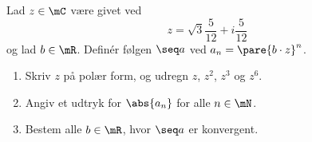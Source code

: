 \setcounter{section}{1}
\begin{opg}
Lad $z\in\mC$ være givet ved
$$ z = \sqrt{3}\frac{5}{12}+i\frac{5}{12} $$
og lad $b\in\mR$. Definér følgen $\seq a$ ved $a_n = \pare{b\cdot z}^n$.
\begin{enumerate}
    \item Skriv $z$ på polær form, og udregn $z$, $z^2$, $z^3$ og $z^6$. 
    
    
    \item Angiv et udtryk for $\abs{a_n}$ for alle $n\in\mN$.

    
    
    \item Bestem alle $b\in\mR$, hvor $\seq a$ er konvergent.
    

\end{enumerate}
\end{opg}
